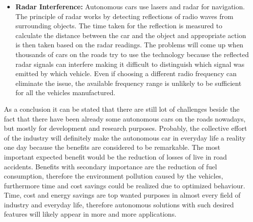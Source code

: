 \documentclass[12pt,english]{article}
\begin{document}
\begin{itemize}
	\item \textbf{Radar Interference:}
	Autonomous cars use lasers and radar for navigation. The principle of radar works by detecting reflections of radio waves from surrounding objects. The time taken for the reflection is measured to calculate the distance between the car and the object and appropriate action is then taken based on the radar readings. The problems will come up when thousands of cars on the roads try to use the technology because the reflected radar signals can interfere making it difficult to distinguish which signal was emitted by which vehicle. Even if choosing a different radio frequency can eliminate the issue, the available frequency range is unlikely to be sufficient for all the vehicles manufactured.
	\cite{5c}
\end{itemize}
As a conclusion it can be stated that there are still lot of challenges beside the fact that there have been already some autonomous cars on the roads nowadays, but mostly for development and research purposes. Probably, the collective effort of the industry will definitely make the autonomous car in everyday life a reality one day because the benefits are considered to be remarkable. The most important expected benefit would be the reduction of losses of live in road accidents. Benefits with secondary importance are the reduction of fuel consumption, therefore the environment pollution caused by the vehicles, furthermore time and cost savings could be realized due to optimized behaviour. Time, cost and energy savings are top wanted purposes in almost every field of industry and everyday life, therefore autonomous solutions with such desired features will likely appear in more and more applications. 
\end{document}
